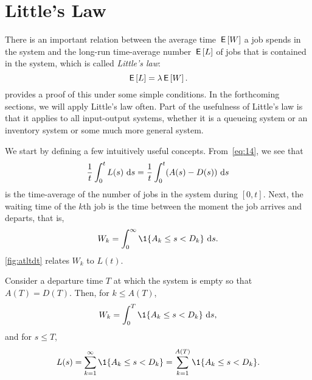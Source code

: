 \section{Little's Law}
\label{sec:littles-law}



There is an important relation between the average time $\,\mathsf{E}\left[W\right]$ a job
spends in the system and the long-run time-average number $\,\mathsf{E}\left[L\right]$ of jobs
that is contained in the system, which is called \emph{Little's law}:
\begin{equation}\label{eq:53}
 \,\mathsf{E}\left[L\right] = \lambda \,\mathsf{E}\left[W\right].
\end{equation}
 provides a proof of this under some simple conditions.
In the forthcoming sections, we will apply Little's law often.
Part of the usefulness of Little's law is that it applies to all input-output systems, whether it is a queueing system or an inventory system or some much more general system.

We start by defining a few intuitively useful concepts. From~\cref{eq:14}, we see that
\begin{equation*}
\frac 1 t\int_0^t L(s)\, \,\text{d}s = \frac 1 t\int_0^t (A(s)-D(s)) \, \,\text{d}s
\end{equation*}
is the time-average of the number of jobs in the system during
$[0,t]$.
Next, the waiting time of the $k$th job is the time between the moment the
job arrives and departs, that is, 
\begin{equation*}
 W_k = \int_0^\infty \1{A_k \leq s < D_k}\,\d s.
\end{equation*}
\cref{fig:atltdt}  relates $W_k$ to $L(t)$.

Consider a departure time $T$ at which the system is empty so that $A(T) = D(T)$.
Then, for $k\leq A(T)$, 
\begin{equation*}
 W_k = \int_0^T \1{A_k \leq s < D_k}\,\d s,
\end{equation*}
and for $s\leq T$,
\begin{equation*}
L(s) = \sum_{k=1}^\infty \1{A_k \leq s < D_k} = \sum_{k=1}^{A(T)}\1{A_k \leq s < D_k}.
\end{equation*}



